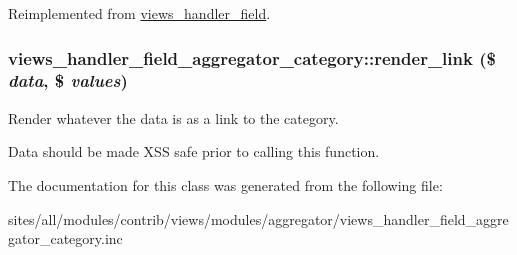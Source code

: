 Reimplemented from \hyperlink{classviews__handler__field_82ff951c5e9ceb97b2eab86f880cbc1e}{views\_\-handler\_\-field}.\hypertarget{classviews__handler__field__aggregator__category_ed3df98f87fc7d2e61ff3206505e2822}{
\subsubsection[{render\_\-link}]{\setlength{\rightskip}{0pt plus 5cm}views\_\-handler\_\-field\_\-aggregator\_\-category::render\_\-link (\$ {\em data}, \/  \$ {\em values})}}
\label{classviews__handler__field__aggregator__category_ed3df98f87fc7d2e61ff3206505e2822}


Render whatever the data is as a link to the category.

Data should be made XSS safe prior to calling this function. 

The documentation for this class was generated from the following file:\begin{CompactItemize}
\item 
sites/all/modules/contrib/views/modules/aggregator/views\_\-handler\_\-field\_\-aggregator\_\-category.inc\end{CompactItemize}

